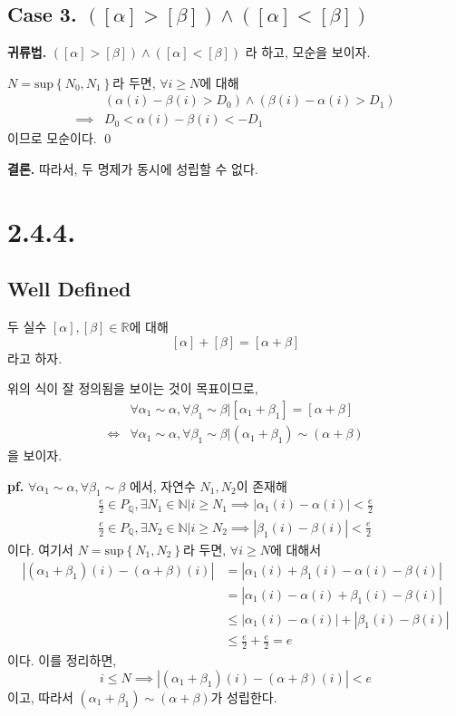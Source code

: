 \documentclass{article}
\begin{document}
\subsection{Case 3. $([\alpha] > [\beta] )\wedge( [\alpha] < [\beta])$}
\textbf{귀류법.} $([\alpha] > [\beta] )\wedge( [\alpha] < [\beta])$ 라 하고, 모순을 보이자.

$N = \text{sup}\left\{N_0, N_1\right\}$라 두면, $\forall i \ge N$에 대해
\begin{align*}
&\left( \alpha(i) - \beta(i) > D_0 \right) \wedge \left( \beta(i) - \alpha(i) > D_1 \right) \\
\implies & D_0 < \alpha(i) - \beta(i) < - D_1
\end{align*}이므로 모순이다. \qed

\textbf{결론.} 따라서, 두 명제가 동시에 성립할 수 없다.

\section{2.4.4.}
\subsection{Well Defined}
두 실수 $[\alpha], [\beta] \in \mathbb{R}$에 대해
$$[\alpha] + [\beta] = [\alpha + \beta]$$
라고 하자.

위의 식이 잘 정의됨을 보이는 것이 목표이므로,
\begin{align*}
&\forall \alpha_1 \sim \alpha, \forall \beta_1 \sim \beta \bigg| [\alpha_1 + \beta_1] = [\alpha + \beta]\\
\iff &\forall \alpha_1 \sim \alpha, \forall \beta_1 \sim \beta \bigg| (\alpha_1 + \beta_1) \sim (\alpha + \beta)
\end{align*}
을 보이자.

\textbf{pf.}
$ \forall \alpha_1 \sim \alpha, \forall \beta_1 \sim \beta$ 에서, 자연수 $N_1, N_2$이 존재해
\begin{align*}
\frac{e}{2} \in P_\mathbb{Q}, \exists N_1 \in \mathbb{N} \bigg| i \ge N_1 \implies \left| \alpha_1 (i) - \alpha(i)  \right| < \frac{e}{2} \tag{1}\\
\frac{e}{2} \in P_\mathbb{Q}, \exists N_2 \in \mathbb{N} \bigg| i \ge N_2 \implies \left| \beta_1 (i) - \beta(i)  \right| < \frac{e}{2} \tag{2}
\end{align*}이다. 여기서 $N = \text{sup}\left\{N_1, N_2\right\}$라 두면, $\forall i \ge N$에 대해서
\begin{align*}
\left| (\alpha_1+ \beta_1)(i) - (\alpha+\beta)(i) \right|  &= \left| \alpha_1(i) + \beta_1(i) - \alpha(i)  - \beta(i) \right| \\
&= \left| \alpha_1(i) - \alpha(i) + \beta_1(i) - \beta(i) \right| \\
&\le \left| \alpha_1(i) - \alpha(i) \right| + \left|\beta_1(i) - \beta(i) \right| \\
&\le \frac{e}{2} + \frac{e}{2} = e
\end{align*}이다. 이를 정리하면,
$$i \le N \implies \left| (\alpha_1+ \beta_1)(i) - (\alpha+\beta)(i) \right| < e$$
이고, 따라서 $(\alpha_1 + \beta_1) \sim (\alpha + \beta)$가 성립한다.
\end{document}
